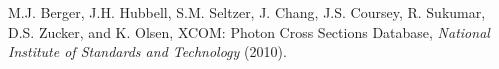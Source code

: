 \begin{thebibliography}{99}

M.J. Berger, J.H. Hubbell, S.M. Seltzer, J. Chang, J.S. Coursey, R. Sukumar, D.S. Zucker, and K. Olsen, XCOM: Photon Cross Sections Database, \emph{National Institute of Standards and Technology} (2010).

\end{thebibliography}